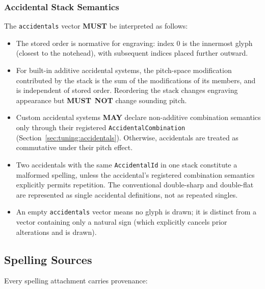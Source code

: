 \documentclass[11pt,letterpaper]{report}
\newcounter{requirement}[chapter]
\newcommand{\MUST}{\textbf{MUST}}
\newcommand{\MUSTNOT}{\textbf{MUST}\nobreak\ \textbf{NOT}}
\newcommand{\MAY}{\textbf{MAY}}
\begin{document}
\subsubsection{Accidental Stack Semantics}
\label{sec:pitch:accidental-stack}

\begin{requirement}
  \label{req:pitch:accidental-stack}
  The \texttt{accidentals} vector \MUST{} be interpreted as follows:

  \begin{itemize}
    \item The stored order is normative for engraving: index 0 is
      the innermost glyph (closest to the notehead), with subsequent
      indices placed further outward.
    \item For built-in additive accidental systems, the pitch-space
      modification contributed by the stack is the sum of the
      modifications of its members, and is independent of stored
      order. Reordering the stack changes engraving appearance but
      \MUSTNOT{} change sounding pitch.
    \item Custom accidental systems \MAY{} declare non-additive
      combination semantics only through their registered
      \texttt{AccidentalCombination} (Section~\ref{sec:tuning:accidentals}).
      Otherwise, accidentals are treated as commutative under their
      pitch effect.
    \item Two accidentals with the same \texttt{AccidentalId} in one
      stack constitute a malformed spelling, unless the accidental's
      registered combination semantics explicitly permits repetition.
      The conventional double-sharp and double-flat are represented
      as single accidental definitions, not as repeated singles.
    \item An empty \texttt{accidentals} vector means no glyph is
      drawn; it is distinct from a vector containing only a natural
      sign (which explicitly cancels prior alterations and is drawn).
  \end{itemize}
\end{requirement}

\subsection{Spelling Sources}

Every spelling attachment carries provenance:
\end{document}

